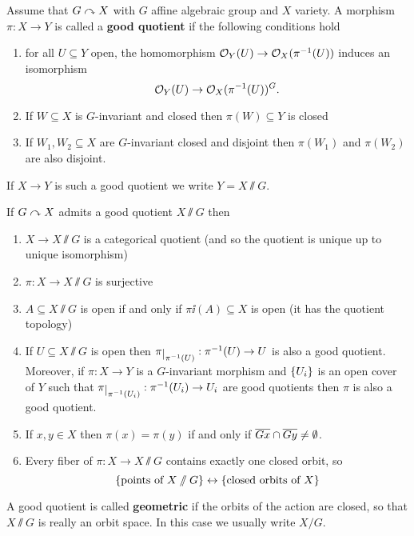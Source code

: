\begin{definition}[]
Assume that $G\curvearrowright X$ with $G$ affine algebraic group and $X$ variety. A morphism $\pi:X\to Y$ is called a \textbf{good quotient} if the following conditions hold
\begin{enumerate}
\item for all $U\subseteq Y$ open, the homomorphism $\mathcal{O}_Y(U)\to \mathcal{O}_X(\pi^{-1}(U))$ induces an isomorphism
\[\mathcal{O}_Y(U)\to \mathcal{O}_X(\pi^{-1}(U))^G.\]
\item If $W\subseteq X$ is $G$-invariant and closed then $\pi(W)\subseteq Y$ is closed
\item If $W_1,W_2\subseteq X$ are $G$-invariant closed and disjoint then $\pi(W_1)$ and $\pi(W_2)$ are also disjoint.
\end{enumerate}
If $X\to Y$ is such a good quotient we write $Y=X\sslash G$.
\end{definition}



\begin{fact}[]
If $G\curvearrowright X$ admits a good quotient $X\sslash G$ then
\begin{enumerate}
\item $X\to X\sslash G$ is a categorical quotient (and so the quotient is unique up to unique isomorphism)
\item $\pi:X\to X\sslash G$ is surjective
\item $A\subseteq X\sslash G$ is open if and only if $\pi\ii(A)\subseteq X$ is open (it has the quotient topology)
\item If $U\subseteq X\sslash G$ is open then $\pi\res{\pi\ii(U)}:\pi\ii(U)\to U$ is also a good quotient. Moreover, if $\pi:X\to Y$ is a $G$-invariant morphism and $\left\{{U_i}\right\}$ is an open cover of $Y$ such that $\pi\res{\pi\ii(U_i)}:\pi\ii(U_i)\to U_i$ are good quotients then $\pi$ is also a good quotient.
\item If $x,y\in X$ then $\pi(x)=\pi(y)$ if and only if $\overline{G x}\cap \overline{G y}\neq \emptyset$.
\item Every fiber of $\pi:X\to X\sslash G$ contains exactly one closed orbit, so
\[\left\{{\text{points of }X\sslash G}\right\}\leftrightarrow\left\{{\text{closed orbits of }X}\right\}\]
\end{enumerate}
\end{fact}


\begin{definition}[]
A good quotient is called \textbf{geometric} if the orbits of the action are closed, so that $X\sslash G$ is really an orbit space. In this case we usually write $X/G$.
\end{definition}


